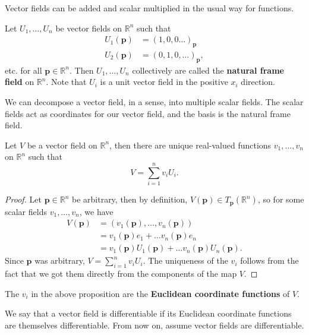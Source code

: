 \documentclass[10pt]{report}
\begin{document}
Vector fields can be added and scalar multiplied in the usual way for functions.

Let $U_1, \dots, U_n$ be vector fields on $\mathbb{R}^n$ such that
\begin{align*}
	U_1(\mathbf{p}) &= (1, 0, 0 \dots)_\mathbf{p} \\
	U_2(\mathbf{p}) &= (0, 1, 0, \dots)_\mathbf{p},
\end{align*} etc. for all $\mathbf{p} \in \mathbb{R}^n$. Then $U_1, \dots, U_n$ collectively are called the \textbf{natural frame field} on $\mathbb{R}^n$. Note that $U_i$ is a unit vector field in the positive $x_i$ direction.

We can decompose a vector field, in a sense, into multiple scalar fields. The scalar fields act as coordinates for our vector field, and the basis is the natural frame field.

\begin{prop}
	Let $V$ be a vector field on $\mathbb{R}^n$, then there are unique real-valued functions $v_1, \dots, v_n$ on $\mathbb{R}^n$ such that
	\[
	V = \sum_{i=1}^{n} v_i U_i.
	\] 
\end{prop}
\begin{proof}
	Let $\mathbf{p} \in \mathbb{R}^n$ be arbitrary, then by definition, $V(\mathbf{p}) \in T_\mathbf{p}(\mathbb{R}^n)$, so for some scalar fields $v_1, \dots, v_n$, we have
	\begin{align*}
		V(\mathbf{p}) &= (v_1(\mathbf{p}), \dots, v_n(\mathbf{p})) \\
		     &= v_1(\mathbf{p})e_1 + \dots v_n(\mathbf{p})e_n \\
		     &= v_1(\mathbf{p}) U_1(\mathbf{p}) + \dots v_n(\mathbf{p}) U_n(\mathbf{p}).
	\end{align*}
	Since $\mathbf{p}$ was arbitrary, $V = \sum_{i=1}^{n} v_i U_i$. The uniqueness of the $v_i$ follows from the fact that we got them directly from the components of the map $V$.
\end{proof}

\begin{defn}
	The $v_i$ in the above proposition are the \textbf{Euclidean coordinate functions} of $V$.
\end{defn}

\begin{note}
	We say that a vector field is differentiable if its Euclidean coordinate functions are themselves differentiable. From now on, assume vector fields are differentiable.
\end{note}
\end{document}
